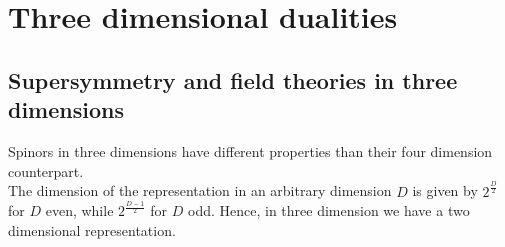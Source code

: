 

\chapter{Three dimensional dualities}
\section{Supersymmetry and field theories in three dimensions}
Spinors in three dimensions have different properties than their four dimension counterpart.\\
The dimension of the representation in an arbitrary dimension $D$  is given by $2^{\frac{D}{2}} $
for $D$ even, while $2^{\frac{D-1}{2}} $ for $D$ odd.
Hence, in three dimension we have a two dimensional representation.

